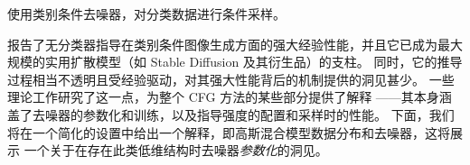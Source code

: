 \documentclass[../../book-main_zh.tex]{subfiles}
\begin{document}
\begin{algorithm}
  \caption{使用类别条件去噪器，对分类数据进行条件采样。}
	\label{alg:iterative_denoising_conditional_CFG}
	\begin{algorithmic}[1]
		 
		\EndFor
		\EndFunction
	\end{algorithmic}
\end{algorithm}

\textcite{Ho2022-ry} 报告了无分类器指导在类别条件图像生成方面的强大经验性能，并且它已成为最大规模的实用扩散模型（如 Stable Diffusion \cite{rombach2022high} 及其衍生品）的支柱。
同时，它的推导过程相当不透明且受经验驱动，对其强大性能背后的机制提供的洞见甚少。
一些理论工作研究了这一点，为整个 CFG 方法的某些部分提供了解释 \cite{Bradley2024-jg,Li2025-li,Wu2024-js}——其本身涵盖了去噪器的参数化和训练，以及指导强度的配置和采样时的性能。
下面，我们将在一个简化的设置中给出一个解释，即高斯混合模型数据分布和去噪器，这将展示 %
一个关于在存在此类低维结构时去噪器\textit{参数化}的洞见。
\end{document}
